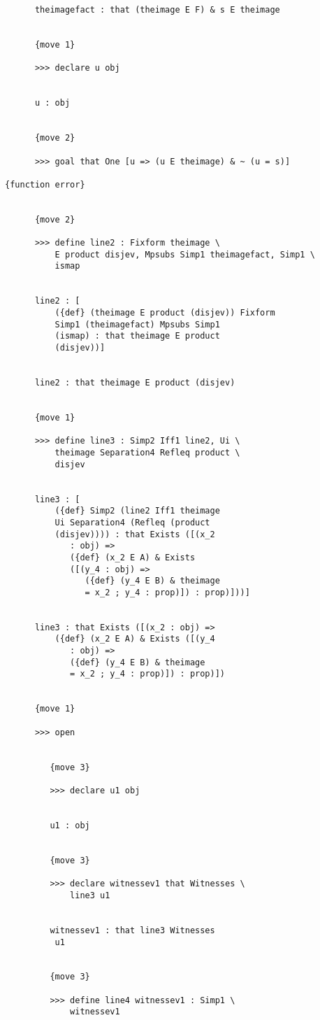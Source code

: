 \documentclass[12pt]{article}
\begin{document}
\begin{verbatim}
      theimagefact : that (theimage E F) & s E theimage


      {move 1}

      >>> declare u obj


      u : obj


      {move 2}

      >>> goal that One [u => (u E theimage) & ~ (u = s)]

{function error}


      {move 2}

      >>> define line2 : Fixform theimage \
          E product disjev, Mpsubs Simp1 theimagefact, Simp1 \
          ismap


      line2 : [
          ({def} (theimage E product (disjev)) Fixform 
          Simp1 (theimagefact) Mpsubs Simp1 
          (ismap) : that theimage E product 
          (disjev))]


      line2 : that theimage E product (disjev)


      {move 1}

      >>> define line3 : Simp2 Iff1 line2, Ui \
          theimage Separation4 Refleq product \
          disjev


      line3 : [
          ({def} Simp2 (line2 Iff1 theimage 
          Ui Separation4 (Refleq (product 
          (disjev)))) : that Exists ([(x_2 
             : obj) => 
             ({def} (x_2 E A) & Exists 
             ([(y_4 : obj) => 
                ({def} (y_4 E B) & theimage 
                = x_2 ; y_4 : prop)]) : prop)]))]


      line3 : that Exists ([(x_2 : obj) => 
          ({def} (x_2 E A) & Exists ([(y_4 
             : obj) => 
             ({def} (y_4 E B) & theimage 
             = x_2 ; y_4 : prop)]) : prop)])


      {move 1}

      >>> open


         {move 3}

         >>> declare u1 obj


         u1 : obj


         {move 3}

         >>> declare witnessev1 that Witnesses \
             line3 u1


         witnessev1 : that line3 Witnesses 
          u1


         {move 3}

         >>> define line4 witnessev1 : Simp1 \
             witnessev1



\end{verbatim}
\end{document}
